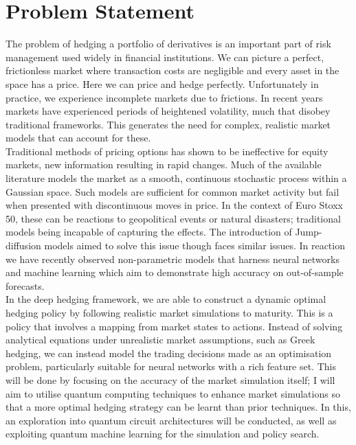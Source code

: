 \documentclass[12pt]{article}
\numberwithin{equation}{section}
\begin{document}
\section{Problem Statement}
The problem of hedging a portfolio of derivatives is an important part of 
risk management used widely in financial institutions. We can picture a perfect, 
frictionless market where transaction costs are negligible and every asset in 
the space has a price. Here we can price and hedge perfectly. Unfortunately in 
practice, we experience incomplete markets due to frictions. In recent years 
markets have experienced periods of heightened volatility, much that disobey 
traditional frameworks. This generates the need for complex, realistic market 
models that can account for these.\\ 
Traditional methods of pricing options has shown to be ineffective for equity 
markets, new information resulting in rapid changes. Much of the available 
literature models the market as a smooth, continuous stochastic process within 
a Gaussian space. Such models are sufficient for common market activity but fail 
when presented with discontinuous moves in price. In the context of Euro Stoxx 50, 
these can be reactions to geopolitical events or natural disasters; traditional
models being incapable of capturing the effects. The introduction of Jump-diffusion 
models aimed to solve this issue though faces similar issues. In reaction we have 
recently observed non-parametric models that harness neural networks and machine 
learning which aim to demonstrate high accuracy on out-of-sample forecasts.
\\
In the deep hedging framework, we are able to construct a dynamic optimal hedging 
policy by following realistic market simulations to maturity. This is a policy 
that involves 
a mapping from market states to actions. Instead of solving analytical equations 
under unrealistic market assumptions, such as Greek hedging, we can instead model
the trading decisions made as an optimisation problem, particularly suitable for 
neural networks with a rich feature set. This will be done by focusing on the 
accuracy of the market simulation itself; I will aim to utilise quantum computing 
techniques to enhance market simulations so that a more optimal hedging strategy 
can be learnt than prior techniques. In this, an exploration into quantum circuit 
architectures will be conducted, as well as exploiting quantum machine learning 
for the simulation and policy search.

\clearpage
\end{document}
